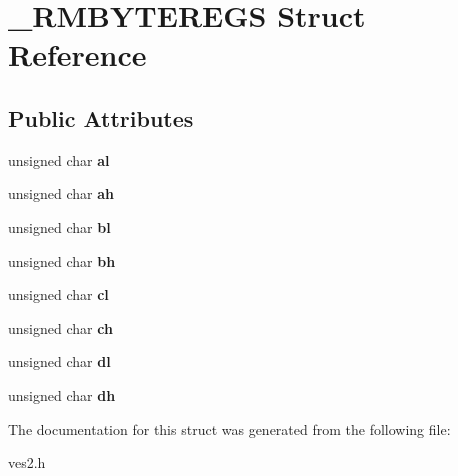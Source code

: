 \section{\-\_\-\-R\-M\-B\-Y\-T\-E\-R\-E\-G\-S Struct Reference}
\label{struct__RMBYTEREGS}
\subsection*{Public Attributes}
\begin{DoxyCompactItemize}
\item 
unsigned char {\bfseries al}\label{struct__RMBYTEREGS_a938df6928069c56e9f5b68675ef7b833}

\item 
unsigned char {\bfseries ah}\label{struct__RMBYTEREGS_a6b608a4babce081682361b641f06194d}

\item 
unsigned char {\bfseries bl}\label{struct__RMBYTEREGS_add81934fd2448837c1f95c1ea9233bd3}

\item 
unsigned char {\bfseries bh}\label{struct__RMBYTEREGS_a41f87b70e711173829ff3d98d2cb8264}

\item 
unsigned char {\bfseries cl}\label{struct__RMBYTEREGS_a65ac00fd9aa9e86f28271c0d018ba202}

\item 
unsigned char {\bfseries ch}\label{struct__RMBYTEREGS_a672bdcfa952751f27ceccfc839a8ba38}

\item 
unsigned char {\bfseries dl}\label{struct__RMBYTEREGS_ad1fdfcd10a0efaaed85df1692038cde7}

\item 
unsigned char {\bfseries dh}\label{struct__RMBYTEREGS_a5738943981121f6148d000f6842324f6}

\end{DoxyCompactItemize}


The documentation for this struct was generated from the following file\-:\begin{DoxyCompactItemize}
\item 
ves2.\-h\end{DoxyCompactItemize}
